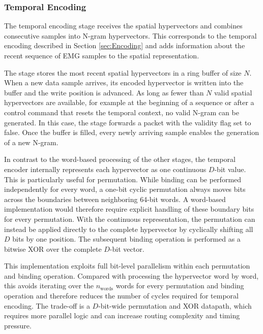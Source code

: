     \subsubsection{Temporal Encoding}
    \label{sec:accerator_ngram_stage}

    The temporal encoding stage receives the spatial hypervectors and combines consecutive samples into N-gram hypervectors. This corresponds to the temporal encoding described in Section \ref{sec:Encoding} and adds information about the recent sequence of EMG samples to the spatial representation.

    The stage stores the most recent spatial hypervectors in a ring buffer of size $N$. When a new data sample arrives, its encoded hypervector is written into the buffer and the write position is advanced. As long as fewer than $N$ valid spatial hypervectors are available, for example at the beginning of a sequence or after a control command that resets the temporal context, no valid N-gram can be generated. In this case, the stage forwards a packet with the validity flag set to false. 
    Once the buffer is filled, every newly arriving sample enables the generation of a new N-gram.

    In contrast to the word-based processing of the other stages, the temporal encoder internally represents each hypervector as one continuous $D$-bit value. This is particularly useful for permutation. While binding can be performed independently for every word, a one-bit cyclic permutation always moves bits across the boundaries between neighboring 64-bit words. A word-based implementation would therefore require explicit handling of these boundary bits for every permutation. With the continuous representation, the permutation can instead be applied directly to the complete hypervector by cyclically shifting all $D$ bits by one position. The subsequent binding operation is performed as a bitwise XOR over the complete $D$-bit vector.

    This implementation exploits full bit-level parallelism within each permutation and binding operation. Compared with processing the hypervector word by word, this avoids iterating over the $n_{\mathrm{words}}$ words for every permutation and binding operation and therefore reduces the number of cycles required for temporal encoding. The trade-off is a $D$-bit-wide permutation and XOR datapath, which requires more parallel logic and can increase routing complexity and timing pressure.\\

